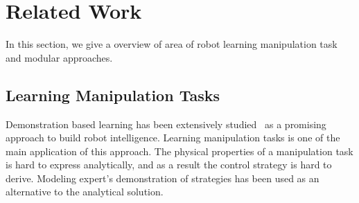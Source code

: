 \section{Related Work}
\label{sec:related}
In this section, we give a overview of area of robot learning manipulation task and modular approaches.



\subsection{Learning Manipulation Tasks}
Demonstration based learning has been extensively studied~\citep{calinon2007learning,dillmann2004teaching,kulic2012incremental} as a promising approach to build robot intelligence. %
Learning manipulation tasks is one of the main application of this approach. The physical properties of a manipulation task is hard to express analytically, and as a result the control strategy is hard to derive. Modeling expert's demonstration of strategies has been used as an alternative to the analytical solution.


